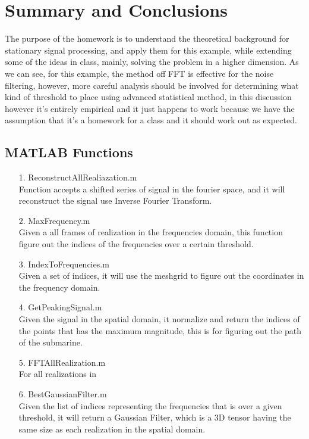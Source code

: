 \documentclass{article}
\begin{document}
\newpage
\section{Summary and Conclusions}
    \hspace{1.1em}
    The purpose of the homework is to understand the theoretical background for stationary signal processing, and apply them for this example, while extending some of the ideas in class, mainly, solving the problem in a higher dimension. As we can see, for this example, the method off FFT is effective for the noise filtering, however, more careful analysis should be involved for determining what kind of threshold to place using advanced statistical method, in this discussion however it's entirely empirical and it just happens to work because we have the assumption that it's a homework for a class and it should work out as expected. 

\printbibliography

\begin{appendices}

\section{MATLAB Functions}
    \begin{enumerate}
        \item[1.] ReconstructAllRealiazation.m \\
        Function accepts a shifted series of signal in the fourier space, and it will reconstruct the signal use Inverse Fourier Transform.  
        \item[2.] MaxFrequency.m \\
        Given a all frames of realization in the frequencies domain, this function figure out the indices of the frequencies over a certain threshold. 
        \item[3.] IndexToFrequencies.m \\
        Given a set of indices, it will use the meshgrid to figure out the coordinates in the frequency domain. 
        \item[4.] GetPeakingSignal.m \\
        Given the signal in the spatial domain, it normalize and return the indices of the points that has the maximum magnitude, this is for figuring out the path of the submarine. 
        \item[5.] FFTAllRealization.m \\
        For all realizations in 
        \item[6.] BestGaussianFilter.m \\
        Given the list of indices representing the frequencies that is over a given threshold, it will return a Gaussian Filter, which is a 3D tensor having the same size as each realization in the spatial domain. 
    \end{enumerate}


    
\end{appendices}
\end{document}
